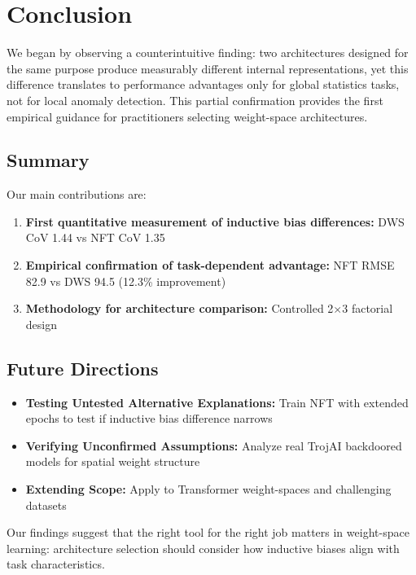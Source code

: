 \section{Conclusion}

We began by observing a counterintuitive finding: two architectures designed for the same purpose produce measurably different internal representations, yet this difference translates to performance advantages only for global statistics tasks, not for local anomaly detection. This partial confirmation provides the first empirical guidance for practitioners selecting weight-space architectures.

\subsection*{Summary}

Our main contributions are:

\begin{enumerate}
    \item \textbf{First quantitative measurement of inductive bias differences:} DWS CoV 1.44 vs NFT CoV 1.35

    \item \textbf{Empirical confirmation of task-dependent advantage:} NFT RMSE 82.9 vs DWS 94.5 (12.3\% improvement)

    \item \textbf{Methodology for architecture comparison:} Controlled 2$\times$3 factorial design
\end{enumerate}

\subsection*{Future Directions}

\begin{itemize}
    \item \textbf{Testing Untested Alternative Explanations:} Train NFT with extended epochs to test if inductive bias difference narrows
    \item \textbf{Verifying Unconfirmed Assumptions:} Analyze real TrojAI backdoored models for spatial weight structure
    \item \textbf{Extending Scope:} Apply to Transformer weight-spaces and challenging datasets
\end{itemize}

Our findings suggest that the right tool for the right job matters in weight-space learning: architecture selection should consider how inductive biases align with task characteristics.
